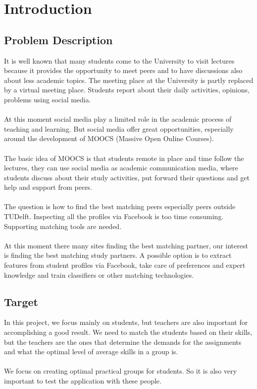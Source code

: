 \chapter{Introduction}

\section{Problem Description}
It is well known that many students come to the University to visit lectures because it provides the opportunity to meet peers and to have discussions also about less academic topics. 
The meeting place at the University is partly replaced by a virtual meeting place. 
Students report about their daily activities, opinions, problems using social media. 
\\\\
At this moment social media play a limited role in the academic process of teaching and learning. 
But social media offer great opportunities, especially around the development of MOOCS (Massive Open Online Courses). 
\\\\
The basic idea of MOOCS is that students remote in place and time follow the lectures, they can use social media as academic communication media, where students discuss about their study activities, put forward their questions and get help and support from peers. 
\\\\
The question is how to find the best matching peers especially peers outside TUDelft. 
Inspecting all the profiles via Facebook is too time consuming. 
Supporting matching tools are needed. 
\\\\
At this moment there many sites finding the best matching partner, our interest is finding the best matching study partners. 
A possible option is to extract features from student profiles via Facebook, take care of preferences and expert knowledge and train classifiers or other matching technologies.

\section{Target}
In this project, we focus mainly on students, but teachers are also important for accomplishing a good result.
We need to match the students based on their skills, but the teachers are the ones that determine the demands for the assignments and what the optimal level of average skills in a group is.
\\\\
We focus on creating optimal practical groups for students.
So it is also very important to test the application with these people.

